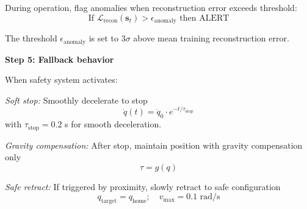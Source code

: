 \begin{example}
During operation, flag anomalies when reconstruction error exceeds threshold:
\begin{equation}
\text{If } \mathcal{L}_{\text{recon}}(\mathbf{s}_t) > \epsilon_{\text{anomaly}} \text{ then ALERT}
\end{equation}

The threshold $\epsilon_{\text{anomaly}}$ is set to 3$\sigma$ above mean training reconstruction error.

\textbf{Step 5: Fallback behavior}

When safety system activates:

\textit{Soft stop:} Smoothly decelerate to stop
\begin{equation}
\dot{q}(t) = \dot{q}_0 \cdot e^{-t/\tau_{\text{stop}}}
\end{equation}
with $\tau_{\text{stop}} = 0.2$ s for smooth deceleration.

\textit{Gravity compensation:} After stop, maintain position with gravity compensation only
\begin{equation}
\tau = g(q)
\end{equation}

\textit{Safe retract:} If triggered by proximity, slowly retract to safe configuration
\begin{equation}
q_{\text{target}} = q_{\text{home}}; \quad v_{\max} = 0.1 \text{ rad/s}
\end{equation}
\end{example}


